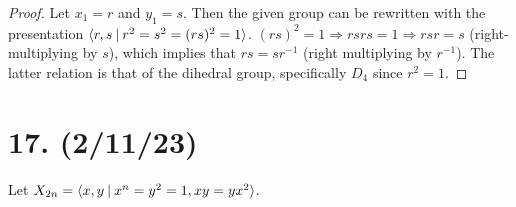 \documentclass{article}
\begin{document}
\begin{proof}
    Let $x_1 = r$ and $y_1 = s$. Then the given group can be rewritten with the presentation $\langle r, s \hspace{0.5ex}|\hspace{0.5ex} r^2 = s^2 = (rs)^2 = 1 \rangle$. $(rs)^2 = 1 \Rightarrow rsrs = 1 \Rightarrow rsr = s$ (right-multiplying by $s$), which implies that $rs = sr^{-1}$ (right multiplying by $r^{-1}$). The latter relation is that of the dihedral group, specifically $D_4$ since $r^2 = 1$.
\end{proof}

\section*{17. (2/11/23)}

Let $X_{2n} = \langle x, y \hspace{0.5ex}|\hspace{0.5ex} x^n = y^2 = 1, xy = yx^2 \rangle$.
\end{document}

